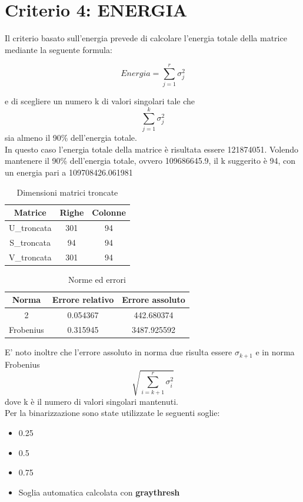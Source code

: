 \section{Criterio 4: ENERGIA}

Il criterio basato sull'energia prevede di calcolare l'energia totale della matrice mediante la seguente formula:

\begin{equation}
    Energia=\sum_{j=1}^r \sigma_j^2
\end{equation}

\noindent e di scegliere un numero k di valori singolari tale che 
\begin{equation}
    \sum_{j=1}^k \sigma_j^2
\end{equation}
sia almeno il 90\% dell'energia totale.\\

\noindent In questo caso l'energia totale della matrice è risultata essere 121874051. Volendo mantenere il 90\% dell'energia totale, ovvero 109686645.9,  il k suggerito è 94, con un energia pari a 109708426.061981
\begin{table}[H]
    \centering
    \begin{tabular}{|c|c|c|}
        \hline
        \textbf{Matrice} & \textbf{Righe} & \textbf{Colonne} \\
        \hline
        U\_troncata & 301 & 94 \\
        \hline
        S\_troncata & 94 & 94 \\
        \hline
        V\_troncata & 301 & 94 \\
        \hline
    \end{tabular}
    \caption{Dimensioni matrici troncate}
\end{table}

\begin{table}[H]
    \centering
    \begin{tabular}{|c|c|c|}
        \hline
        \textbf{Norma} & \textbf{Errore relativo} & \textbf{Errore assoluto} \\
        \hline
        2 & 0.054367 & 442.680374 \\
        \hline
        Frobenius & 0.315945 & 3487.925592 \\
        \hline
    \end{tabular}
    \caption{Norme ed errori}
\end{table}

\noindent
E' noto inoltre che l'errore assoluto in norma due risulta essere $\sigma_{k+1}$ e in norma Frobenius 
\begin{equation}
    \sqrt{\sum_{i=k+1}^{r}\sigma_i^2}
\end{equation}
 dove k è il numero di valori singolari mantenuti.\\
Per la binarizzazione sono state utilizzate le seguenti soglie:
\begin{itemize}
    \item 0.25
    \item 0.5
    \item 0.75
    \item Soglia automatica calcolata con \textbf{graythresh}
\end{itemize}

